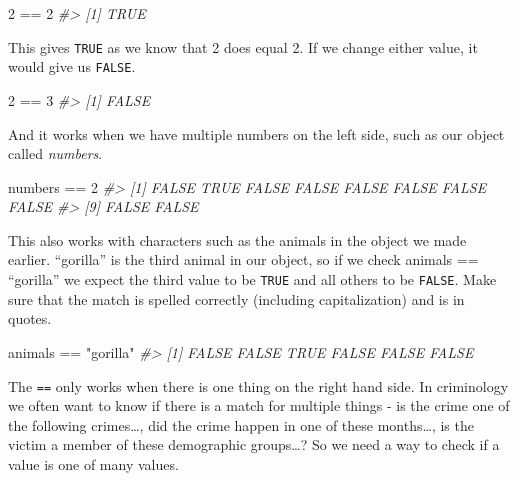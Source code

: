 \documentclass[
]{krantz}
\makeatletter
\newenvironment{Shaded}{\begin{snugshade}}{\end{snugshade}}
\newcommand{\CommentTok}[1]{\textcolor[rgb]{0.37,0.37,0.37}{\textit{#1}}}
\newcommand{\DecValTok}[1]{\textcolor[rgb]{0.06,0.06,0.06}{#1}}
\newcommand{\NormalTok}[1]{#1}
\newcommand{\SpecialCharTok}[1]{\textcolor[rgb]{0,0,0}{#1}}
\newcommand{\StringTok}[1]{\textcolor[rgb]{0.5,0.5,0.5}{#1}}
\newenvironment{kframe}{%
\medskip{}
\setlength{\fboxsep}{.8em}
 \def\at@end@of@kframe{}%
 \ifinner\ifhmode%
  \def\at@end@of@kframe{\end{minipage}}%
  \begin{minipage}{\columnwidth}%
 \fi\fi%
 \def\FrameCommand##1{\hskip\@totalleftmargin \hskip-\fboxsep
 \colorbox{shadecolor}{##1}\hskip-\fboxsep
     \hskip-\linewidth \hskip-\@totalleftmargin \hskip\columnwidth}%
 \MakeFramed {\advance\hsize-\width
   \@totalleftmargin\z@ \linewidth\hsize
   \@setminipage}}%
 {\par\unskip\endMakeFramed%
 \at@end@of@kframe}
\renewenvironment{Shaded}{\begin{kframe}}{\end{kframe}}
\makeatother
\begin{document}
\begin{Shaded}
\begin{Highlighting}[]
\DecValTok{2} \SpecialCharTok{==} \DecValTok{2}
\CommentTok{\#\textgreater{} [1] TRUE}
\end{Highlighting}
\end{Shaded}

This gives \texttt{TRUE} as we know that 2 does equal 2. If we change either value, it would give us \texttt{FALSE}.

\begin{Shaded}
\begin{Highlighting}[]
\DecValTok{2} \SpecialCharTok{==} \DecValTok{3}
\CommentTok{\#\textgreater{} [1] FALSE}
\end{Highlighting}
\end{Shaded}

And it works when we have multiple numbers on the left side, such as our object called \emph{numbers}.

\begin{Shaded}
\begin{Highlighting}[]
\NormalTok{numbers }\SpecialCharTok{==} \DecValTok{2}
\CommentTok{\#\textgreater{}  [1] FALSE  TRUE FALSE FALSE FALSE FALSE FALSE FALSE}
\CommentTok{\#\textgreater{}  [9] FALSE FALSE}
\end{Highlighting}
\end{Shaded}

This also works with characters such as the animals in the object we made earlier. ``gorilla'' is the third animal in our object, so if we check animals == ``gorilla'' we expect the third value to be \texttt{TRUE} and all others to be \texttt{FALSE}. Make sure that the match is spelled correctly (including capitalization) and is in quotes.

\begin{Shaded}
\begin{Highlighting}[]
\NormalTok{animals }\SpecialCharTok{==} \StringTok{"gorilla"}
\CommentTok{\#\textgreater{} [1] FALSE FALSE  TRUE FALSE FALSE FALSE}
\end{Highlighting}
\end{Shaded}

The \texttt{==} only works when there is one thing on the right hand side. In criminology we often want to know if there is a match for multiple things - is the crime one of the following crimes\ldots, did the crime happen in one of these months\ldots, is the victim a member of these demographic groups\ldots? So we need a way to check if a value is one of many values.
\end{document}
